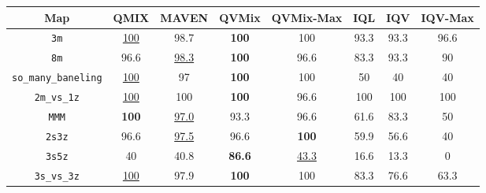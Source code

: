 \setlength\tabcolsep{4.5pt}
\begin{tabular}{|c|c|c|c|c|c|c|c|}
        \hline
        
        Map & QMIX & MAVEN &     QVMix & QVMix-Max  & IQL & IQV & IQV-Max\\
        \hline
         \texttt{3m} & \underline{100} & 98.7 &   \textbf{100} & 100 & 93.3 & 93.3& 96.6 \\
        
         \texttt{8m} & 96.6& \underline{98.3} &  \textbf{100} & 96.6 & 83.3& 93.3& 90\\
        
         \texttt{so\_many\_baneling} & \underline{100} & 97  & \textbf{100}& 100& 50 & 40 & 40\\
        
        \texttt{2m\_vs\_1z} & \underline{100} & 100 &\textbf{100} & 96.6  & 100 & 100 & 100\\
        \hline
        
       \texttt{MMM} & \textbf{100} & \underline{97.0} & 93.3 & 96.6  & 61.6 & 83.3 & 50 \\
        
        \texttt{2s3z}  & 96.6 & \underline{97.5} &  96.6 & \textbf{100} & 59.9 & 56.6 & 40 \\
        
        \texttt{3s5z} & 40 & 40.8 &\textbf{86.6} & \underline{43.3}  & 16.6 & 13.3 & 0 \\
        
        \texttt{3s\_vs\_3z}  & \underline{100} & 97.9  &  \textbf{100} & 100  & 83.3 & 76.6 & 63.3 \\
        \hline
    \end{tabular}
    
        
        
